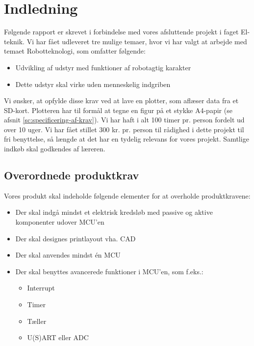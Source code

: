 \chapter{Indledning}
\label{ch:indledning}


Følgende rapport er skrevet i forbindelse med vores afsluttende
projekt i faget El-teknik.  Vi har fået udleveret tre mulige temaer,
hvor vi har valgt at arbejde med temaet Robotteknologi, som omfatter
følgende:

\begin{itemize} \firmlist
\item Udvikling af udstyr med funktioner af robotagtig karakter
\item Dette udstyr skal virke uden menneskelig indgriben
\end{itemize}

Vi ønsker, at opfylde disse krav ved at lave en plotter, som aflæser
data fra et SD-kort. Plotteren har til formål at tegne en figur på et
stykke A4-papir (se afsnit \vref{sc:specificering-af-krav}). Vi har
haft i alt 100 timer pr. person fordelt ud over 10 uger. Vi har fået
stillet 300 kr. pr. person til rådighed i dette projekt til fri
benyttelse, så længde at det har en tydelig relevans for vores
projekt. Samtlige indkøb skal godkendes af læreren.


\section{Overordnede produktkrav}

Vores produkt skal indeholde følgende elementer for at overholde
produktkravene:

\begin{itemize} \firmlist
\item Der skal indgå mindst et elektrisk kredsløb med passive og
  aktive komponenter udover MCU'en
\item Der skal designes printlayout vha. CAD
\item Der skal anvendes mindst én MCU
\item Der skal benyttes avancerede funktioner i MCU'en, som f.eks.:
  \begin{itemize}
  \item Interrupt
  \item Timer
  \item Tæller
  \item U(S)ART eller ADC
  \end{itemize}
\end{itemize}


